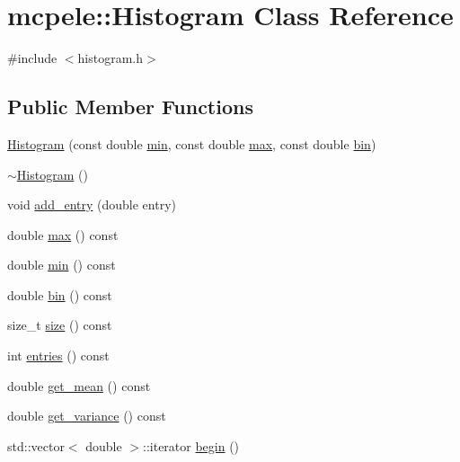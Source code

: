 \hypertarget{classmcpele_1_1Histogram}{\section{mcpele\-:\-:\-Histogram \-Class \-Reference}
\label{classmcpele_1_1Histogram}
}


{\ttfamily \#include $<$histogram.\-h$>$}

\subsection*{\-Public \-Member \-Functions}
\begin{DoxyCompactItemize}
\item 
\hyperlink{classmcpele_1_1Histogram_a527370a55aa12f1a36390865f144ab76}{\-Histogram} (const double \hyperlink{classmcpele_1_1Histogram_a8bb9aea49e095dd5508de32bdc7ebdcf}{min}, const double \hyperlink{classmcpele_1_1Histogram_afb72fcce52a9718593956481e038a333}{max}, const double \hyperlink{classmcpele_1_1Histogram_a9a90258e8df0945f38020b5ae1c9e19f}{bin})
\item 
\hyperlink{classmcpele_1_1Histogram_a13bccf52f23ea879132d6e6b89172915}{$\sim$\-Histogram} ()
\item 
void \hyperlink{classmcpele_1_1Histogram_a2ff51dc04284a0371187d04f808c3c27}{add\-\_\-entry} (double entry)
\item 
double \hyperlink{classmcpele_1_1Histogram_afb72fcce52a9718593956481e038a333}{max} () const 
\item 
double \hyperlink{classmcpele_1_1Histogram_a8bb9aea49e095dd5508de32bdc7ebdcf}{min} () const 
\item 
double \hyperlink{classmcpele_1_1Histogram_a9a90258e8df0945f38020b5ae1c9e19f}{bin} () const 
\item 
size\-\_\-t \hyperlink{classmcpele_1_1Histogram_a493a8f86c28d26c1c66e43ddb5210150}{size} () const 
\item 
int \hyperlink{classmcpele_1_1Histogram_adacd3cc3fc6a0f9a09035d796f436cc6}{entries} () const 
\item 
double \hyperlink{classmcpele_1_1Histogram_a54ac991262cd696da90dd18310995736}{get\-\_\-mean} () const 
\item 
double \hyperlink{classmcpele_1_1Histogram_ad9f034dae24b631fa0b5139cd4f29b1a}{get\-\_\-variance} () const 
\item 
std\-::vector$<$ double $>$\-::iterator \hyperlink{classmcpele_1_1Histogram_a93a26f3242e02023172c54b6b82e5516}{begin} ()

\end{DoxyCompactItemize}
